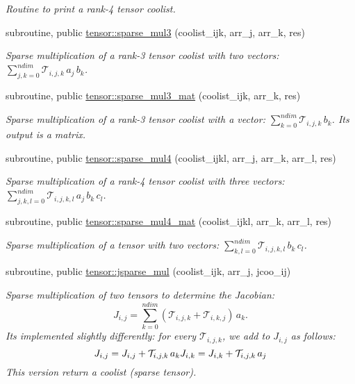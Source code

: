\begin{DoxyCompactItemize}
\begin{DoxyCompactList}\small\item\em Routine to print a rank-\/4 tensor coolist. \end{DoxyCompactList}\item 
subroutine, public \hyperlink{namespacetensor_a11054027a386918658f8948231af53b1}{tensor\+::sparse\+\_\+mul3} (coolist\+\_\+ijk, arr\+\_\+j, arr\+\_\+k, res)
\begin{DoxyCompactList}\small\item\em Sparse multiplication of a rank-\/3 tensor coolist with two vectors\+: ${\displaystyle \sum_{j,k=0}^{ndim}} \mathcal{T}_{i,j,k} \, a_j \,b_k$. \end{DoxyCompactList}\item 
subroutine, public \hyperlink{namespacetensor_a08965e1040a94fc58c1efa9ff9639118}{tensor\+::sparse\+\_\+mul3\+\_\+mat} (coolist\+\_\+ijk, arr\+\_\+k, res)
\begin{DoxyCompactList}\small\item\em Sparse multiplication of a rank-\/3 tensor coolist with a vector\+: ${\displaystyle \sum_{k=0}^{ndim}} \mathcal{T}_{i,j,k} \, b_k$. Its output is a matrix. \end{DoxyCompactList}\item 
subroutine, public \hyperlink{namespacetensor_ab365e6dbb17e7fb26fef90649dd9e445}{tensor\+::sparse\+\_\+mul4} (coolist\+\_\+ijkl, arr\+\_\+j, arr\+\_\+k, arr\+\_\+l, res)
\begin{DoxyCompactList}\small\item\em Sparse multiplication of a rank-\/4 tensor coolist with three vectors\+: ${\displaystyle \sum_{j,k,l=0}^{ndim}} \mathcal{T}_{i,j,k,l} \, a_j \,b_k \, c_l $. \end{DoxyCompactList}\item 
subroutine, public \hyperlink{namespacetensor_a2fda12a024f8e3d0d6a167f264f6d000}{tensor\+::sparse\+\_\+mul4\+\_\+mat} (coolist\+\_\+ijkl, arr\+\_\+k, arr\+\_\+l, res)
\begin{DoxyCompactList}\small\item\em Sparse multiplication of a tensor with two vectors\+: ${\displaystyle \sum_{k,l=0}^{ndim}} \mathcal{T}_{i,j,k,l} \,b_k \, c_l $. \end{DoxyCompactList}\item 
subroutine, public \hyperlink{namespacetensor_add2a6aa993cd8a23be60d1643b5c7942}{tensor\+::jsparse\+\_\+mul} (coolist\+\_\+ijk, arr\+\_\+j, jcoo\+\_\+ij)
\begin{DoxyCompactList}\small\item\em Sparse multiplication of two tensors to determine the Jacobian\+: \[J_{i,j} = {\displaystyle \sum_{k=0}^{ndim}} \left( \mathcal{T}_{i,j,k} + \mathcal{T}_{i,k,j} \right) \, a_k.\] It\textquotesingle{}s implemented slightly differently\+: for every $\mathcal{T}_{i,j,k}$, we add to $J_{i,j}$ as follows\+: \[J_{i,j} = J_{i,j} + \mathcal{T}_{i,j,k} \, a_k \\ J_{i,k} = J_{i,k} + \mathcal{T}_{i,j,k} \, a_j\] This version return a coolist (sparse tensor). \end{DoxyCompactList}\item 

\end{DoxyCompactItemize}
